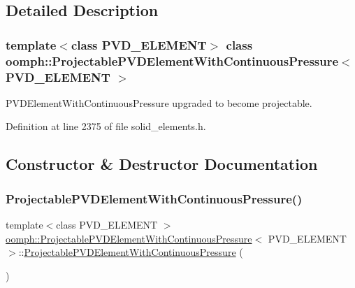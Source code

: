\subsection{Detailed Description}
\subsubsection*{template$<$class P\+V\+D\+\_\+\+E\+L\+E\+M\+E\+NT$>$\newline
class oomph\+::\+Projectable\+P\+V\+D\+Element\+With\+Continuous\+Pressure$<$ P\+V\+D\+\_\+\+E\+L\+E\+M\+E\+N\+T $>$}

P\+V\+D\+Element\+With\+Continuous\+Pressure upgraded to become projectable. 

Definition at line 2375 of file solid\+\_\+elements.\+h.



\subsection{Constructor \& Destructor Documentation}
\mbox{\label{classoomph_1_1ProjectablePVDElementWithContinuousPressure_a973f20aa3b0a7daffd6295f1aa51b475}} 
\subsubsection{\texorpdfstring{Projectable\+P\+V\+D\+Element\+With\+Continuous\+Pressure()}{ProjectablePVDElementWithContinuousPressure()}}
{\footnotesize\ttfamily template$<$class P\+V\+D\+\_\+\+E\+L\+E\+M\+E\+NT $>$ \\
\hyperlink{classoomph_1_1ProjectablePVDElementWithContinuousPressure}{oomph\+::\+Projectable\+P\+V\+D\+Element\+With\+Continuous\+Pressure}$<$ P\+V\+D\+\_\+\+E\+L\+E\+M\+E\+NT $>$\+::\hyperlink{classoomph_1_1ProjectablePVDElementWithContinuousPressure}{Projectable\+P\+V\+D\+Element\+With\+Continuous\+Pressure} (\begin{DoxyParamCaption}{ }\end{DoxyParamCaption})\hspace{0.3cm}{\ttfamily [inline]}}



